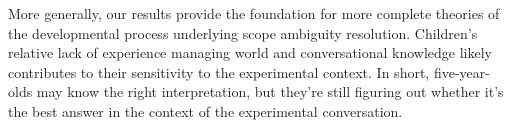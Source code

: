 \documentclass[10pt,a4paper]{article}
\newcommand{\gcs}[1]{\textcolor{blue}{[gcs: #1]}}
\begin{document}
 

More generally, our results provide the foundation for more complete theories of the developmental process underlying scope ambiguity resolution. Children's relative lack of experience managing world and conversational knowledge likely contributes to their sensitivity to the experimental context.
In short, five-year-olds may know the right interpretation, but they're still figuring out whether it's the best answer in the context of the experimental conversation. 
 












\setlength{\bibleftmargin}{.125in}
\setlength{\bibindent}{-\bibleftmargin}


\end{document}
